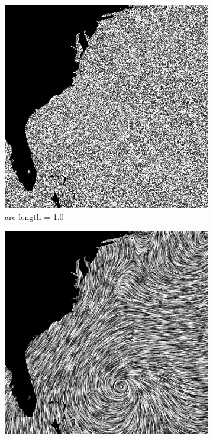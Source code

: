 \documentclass{article}
\begin{document}
\begin{figure}[h!]
    \centering
    \begin{subfigure}{0.30\textwidth}
        \centering
        \includegraphics[width=\textwidth]{LIC_isabel_arc_length_1.png}
        \caption{arc length = 1.0}
    \end{subfigure}
    \hfill
    \begin{subfigure}{0.30\textwidth}
        \centering
        \includegraphics[width=\textwidth]{LIC_isabel_arc_length_8.png}

\end{subfigure}
\end{figure}
\end{document}
